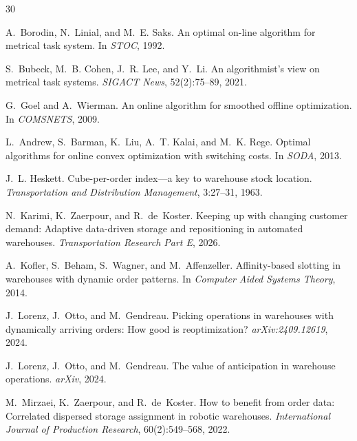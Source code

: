 \documentclass[11pt,a4paper]{article}
\begin{document}

\begin{thebibliography}{30}

A.~Borodin, N.~Linial, and M.~E. Saks.
\newblock An optimal on-line algorithm for metrical task system.
\newblock In \emph{STOC}, 1992.

S.~Bubeck, M.~B. Cohen, J.~R. Lee, and Y.~Li.
\newblock An algorithmist's view on metrical task systems.
\newblock \emph{SIGACT News}, 52(2):75--89, 2021.

G.~Goel and A.~Wierman.
\newblock An online algorithm for smoothed offline optimization.
\newblock In \emph{COMSNETS}, 2009.

L.~Andrew, S.~Barman, K.~Liu, A.~T. Kalai, and M.~K. Rege.
\newblock Optimal algorithms for online convex optimization with switching
costs.
\newblock In \emph{SODA}, 2013.

J.~L. Heskett.
\newblock Cube-per-order index---a key to warehouse stock location.
\newblock \emph{Transportation and Distribution Management}, 3:27--31, 1963.

N.~Karimi, K.~Zaerpour, and R.~de~Koster.
\newblock Keeping up with changing customer demand: Adaptive data-driven
  storage and repositioning in automated warehouses.
\newblock \emph{Transportation Research Part E}, 2026.

A.~Kofler, S.~Beham, S.~Wagner, and M.~Affenzeller.
\newblock Affinity-based slotting in warehouses with dynamic order patterns.
\newblock In \emph{Computer Aided Systems Theory}, 2014.

J.~Lorenz, J.~Otto, and M.~Gendreau.
\newblock Picking operations in warehouses with dynamically arriving orders:
  How good is reoptimization?
\newblock \emph{arXiv:2409.12619}, 2024.

J.~Lorenz, J.~Otto, and M.~Gendreau.
\newblock The value of anticipation in warehouse operations.
\newblock \emph{arXiv}, 2024.

M.~Mirzaei, K.~Zaerpour, and R.~de~Koster.
\newblock How to benefit from order data: Correlated dispersed storage
  assignment in robotic warehouses.
\newblock \emph{International Journal of Production Research},
  60(2):549--568, 2022.


\end{thebibliography}
\end{document}
